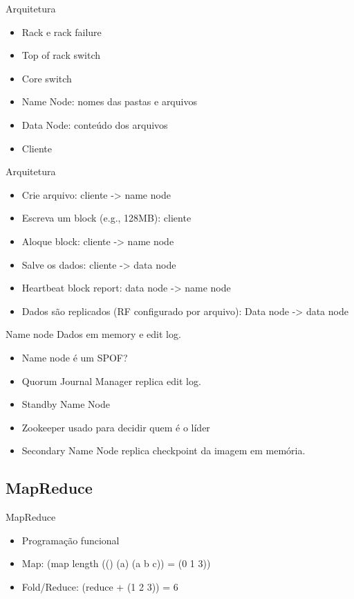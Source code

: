 \begin{frame}{Arquitetura}
\begin{itemize}
	\item Rack e rack failure
	\item Top of rack switch
	\item Core switch
	\item Name Node: nomes das pastas e arquivos
	\item Data Node: conteúdo dos arquivos
	\item Cliente
\end{itemize}
\end{frame}

\begin{frame}{Arquitetura}
\begin{itemize}
	\item Crie arquivo: cliente -> name node
	\item Escreva um block (e.g., 128MB): cliente
	\item Aloque block: cliente -> name node
	\item Salve os dados: cliente -> data node
	\item Heartbeat block report: data node -> name node
	\item Dados são replicados (RF configurado por arquivo): Data node -> data node
\end{itemize}
\end{frame}



\begin{frame}{Name node}
Dados em memory e edit log.

\begin{itemize}
	\item Name node é um SPOF? 
	\item Quorum Journal Manager replica edit log.
	\item Standby Name Node
	\item Zookeeper usado para decidir quem é o líder
	\item Secondary Name Node replica checkpoint da imagem em memória.
\end{itemize}
\end{frame}

\subsection{MapReduce}
\begin{frame}{MapReduce}
	\begin{itemize}
		\item Programação funcional
		\item Map: (map length (() (a) (a b c)) = (0 1 3))
		\item Fold/Reduce: (reduce + (1 2 3)) = 6
	\end{itemize}
\end{frame}


